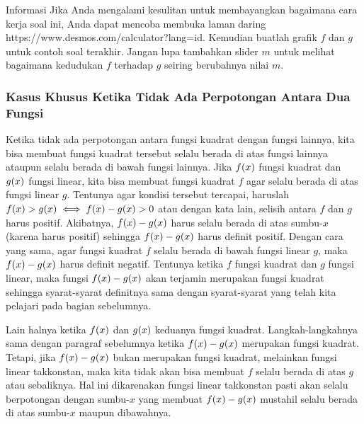 		\begin{infobox}{Informasi}
			Jika Anda mengalami kesulitan untuk membayangkan bagaimana cara kerja soal ini, Anda dapat mencoba membuka laman daring https://www.desmos.com/calculator?lang=id. Kemudian buatlah grafik $ f $ dan $ g $ untuk contoh soal terakhir. Jangan lupa tambahkan slider $ m $ untuk melihat bagaimana kedudukan $ f $ terhadap $ g $ seiring berubahnya nilai $ m $.
		\end{infobox}
	
	\subsubsection{Kasus Khusus Ketika Tidak Ada Perpotongan Antara Dua Fungsi}
		
		Ketika tidak ada perpotongan antara fungsi kuadrat dengan fungsi lainnya, kita bisa membuat fungsi kuadrat tersebut selalu berada di atas fungsi lainnya ataupun selalu berada di bawah fungsi lainnya. Jika $ \mathop{}\!{f}{\left({x}\right)} $ fungsi kuadrat dan $ \mathop{}\!{g}{\left({x}\right)} $ fungsi linear, kita bisa membuat fungsi kuadrat $ f $ agar selalu berada di atas fungsi linear $ g $. Tentunya agar kondisi tersebut tercapai, haruslah $ \mathop{}\!{f}{\left({x}\right)} > \mathop{}\!{g}{\left({x}\right)} \iff \mathop{}\!{f}{\left({x}\right)} - \mathop{}\!{g}{\left({x}\right)} > 0 $ atau dengan kata lain, selisih antara $ f $ dan $ g $ harus positif. Akibatnya, $ \mathop{}\!{f}{\left({x}\right)} - \mathop{}\!{g}{\left({x}\right)} $ harus selalu berada di atas sumbu-$ x $ (karena harus positif) sehingga $ \mathop{}\!{f}{\left({x}\right)} - \mathop{}\!{g}{\left({x}\right)} $ harus definit positif. Dengan cara yang sama, agar fungsi kuadrat $ f $ selalu berada di bawah fungsi linear $ g $, maka $ \mathop{}\!{f}{\left({x}\right)} - \mathop{}\!{g}{\left({x}\right)} $ harus definit negatif. Tentunya ketika $ f $ fungsi kuadrat dan $ g $ fungsi linear, maka fungsi $ \mathop{}\!{f}{\left({x}\right)} - \mathop{}\!{g}{\left({x}\right)} $ akan terjamin merupakan fungsi kuadrat sehingga syarat-syarat definitnya sama dengan syarat-syarat yang telah kita pelajari pada bagian sebelumnya.
		
		\par Lain halnya ketika $ \mathop{}\!{f}{\left({x}\right)} $ dan $ \mathop{}\!{g}{\left({x}\right)} $ keduanya fungsi kuadrat. Langkah-langkahnya sama dengan paragraf sebelumnya ketika $ \mathop{}\!{f}{\left({x}\right)} - \mathop{}\!{g}{\left({x}\right)} $ merupakan fungsi kuadrat. Tetapi, jika $ \mathop{}\!{f}{\left({x}\right)} - \mathop{}\!{g}{\left({x}\right)} $ bukan merupakan fungsi kuadrat, melainkan fungsi linear takkonstan, maka kita tidak akan bisa membuat $ f $ selalu berada di atas $ g $ atau sebaliknya. Hal ini dikarenakan fungsi linear takkonstan pasti akan selalu berpotongan dengan sumbu-$ x $ yang membuat $ \mathop{}\!{f}{\left({x}\right)} - \mathop{}\!{g}{\left({x}\right)} $ mustahil selalu berada di atas sumbu-$ x $ maupun dibawahnya.
		
